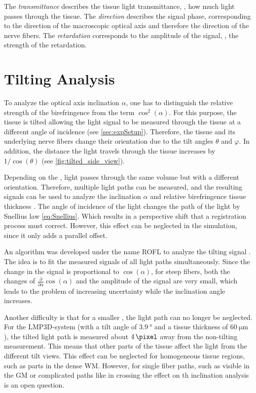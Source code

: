 %
The \textit{transmittance} describes the tissue light transmittance, \ie{}, how much light passes through the tissue.
The \textit{direction} describes the signal phase, corresponding to the direction of the macroscopic optical axis and therefore the direction of the nerve fibers.
The \textit{retardation} corresponds to the amplitude of the signal, \ie{}, the strength of the retardation.
%
%
\section{Tilting Analysis} \label{sec::InclAnalysis}
%
To analyze the optical axis inclination $\alpha$, one has to distinguish the relative strength of the birefringence from the term $\cos^2(\alpha)$.
For this purpose, the tissue is tilted allowing the light signal to be measured through the tissue at a different angle of incidence \cite{Axer2011, Wiese:887678} (see \cref{sec:expSetup}).
Therefore, the tissue and its underlying nerve fibers change their orientation due to the tilt angles $\theta$ and $\varphi$.
In addition, the distance the light travels through the tissue increases by $1/\cos(\theta)$ (see \cref{fig:tilted_side_view}).
\par
%
Depending on the \Pixelsize{}, light passes through the same volume but with a different orientation.
Therefore, multiple light paths can be measured, and the resulting signals can be used to analyze the inclination $\alpha$ and relative birefringence tissue thickness \trel{}.
The angle of incidence of the light changes the path of the light by Snellius law \cref{eq:Snellius}.
Which results in a perspective shift that a registration process must correct.
However, this effect can be neglected in the simulation, since it only adds a parallel offset.
\par
%
An algorithm was developed under the name \ac{ROFL} to analyze the tilting signal \cite{Wiese:887678,Schmitz2018}.
The idea is to fit the measured signals of all light paths simultaneously.
Since the change in the signal is proportional to $\cos(\alpha)$, for steep fibers, both the changes of $\frac{\partial}{\partial \alpha} \cos(\alpha)$ and the amplitude of the signal are very small, which leads to the problem of increasing uncertainty while the inclination angle increases.
\par
%
Another difficulty is that for a smaller \Pixelsize{}, the light path can no longer be neglected.
For the \ac{LMP3D}-system (with a tilt angle of $\SI{3.9}{\degree}$ and a tissue thickness of $\SI{60}{\micro\meter}$), the tilted light path is measured about $\SI{4}{\pixel}$ away from the non-tilting measurement.
This means that other parts of the tissue affect the light from the different tilt views.
This effect can be neglected for homogeneous tissue regions, such as parts in the dense \ac{WM}.
However, for single fiber paths, such as visible in the \ac{GM} or complicated paths like in crossing the effect on th inclination analysis is an open question.
%
%
%
